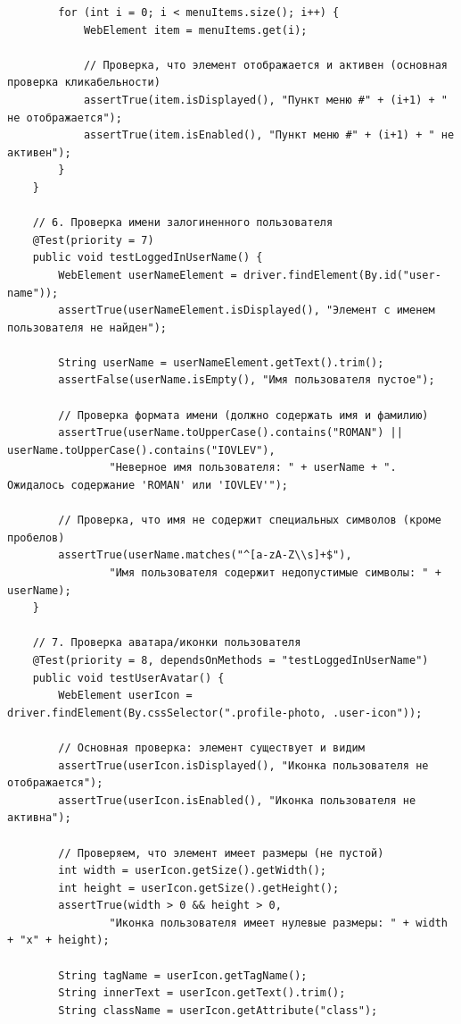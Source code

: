 \documentclass{article}[14pt]
\begin{document}
\begin{lstlisting}
        for (int i = 0; i < menuItems.size(); i++) {
            WebElement item = menuItems.get(i);

            // Проверка, что элемент отображается и активен (основная проверка кликабельности)
            assertTrue(item.isDisplayed(), "Пункт меню #" + (i+1) + " не отображается");
            assertTrue(item.isEnabled(), "Пункт меню #" + (i+1) + " не активен");
        }
    }

    // 6. Проверка имени залогиненного пользователя
    @Test(priority = 7)
    public void testLoggedInUserName() {
        WebElement userNameElement = driver.findElement(By.id("user-name"));
        assertTrue(userNameElement.isDisplayed(), "Элемент с именем пользователя не найден");

        String userName = userNameElement.getText().trim();
        assertFalse(userName.isEmpty(), "Имя пользователя пустое");

        // Проверка формата имени (должно содержать имя и фамилию)
        assertTrue(userName.toUpperCase().contains("ROMAN") || userName.toUpperCase().contains("IOVLEV"),
                "Неверное имя пользователя: " + userName + ". Ожидалось содержание 'ROMAN' или 'IOVLEV'");

        // Проверка, что имя не содержит специальных символов (кроме пробелов)
        assertTrue(userName.matches("^[a-zA-Z\\s]+$"),
                "Имя пользователя содержит недопустимые символы: " + userName);
    }

    // 7. Проверка аватара/иконки пользователя
    @Test(priority = 8, dependsOnMethods = "testLoggedInUserName")
    public void testUserAvatar() {
        WebElement userIcon = driver.findElement(By.cssSelector(".profile-photo, .user-icon"));

        // Основная проверка: элемент существует и видим
        assertTrue(userIcon.isDisplayed(), "Иконка пользователя не отображается");
        assertTrue(userIcon.isEnabled(), "Иконка пользователя не активна");

        // Проверяем, что элемент имеет размеры (не пустой)
        int width = userIcon.getSize().getWidth();
        int height = userIcon.getSize().getHeight();
        assertTrue(width > 0 && height > 0,
                "Иконка пользователя имеет нулевые размеры: " + width + "x" + height);

        String tagName = userIcon.getTagName();
        String innerText = userIcon.getText().trim();
        String className = userIcon.getAttribute("class");


\end{lstlisting}
\end{document}
